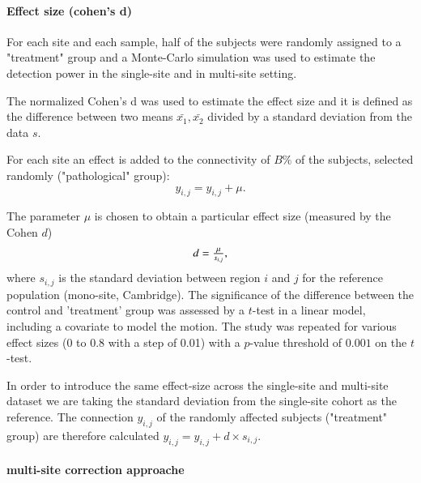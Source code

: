 \documentclass[authoryear]{elsarticle}
\begin{document}
\paragraph{Effect size (cohen's d)}
For each site and each sample, half of the subjects were randomly assigned to a "treatment" group and a Monte-Carlo simulation was used to estimate the detection power in the single-site and in multi-site setting.

The normalized Cohen's d was used to estimate the effect size and it is defined as the difference between two means $\bar{x_{1}},\bar{x_{2}}$ divided by a standard deviation from the data $s$.

For each site an effect is added to the connectivity of $B\%$ of the subjects, selected randomly ("pathological" group):
\begin{equation}
	y_{i,j} = y_{i,j} + \mu.
\end{equation}

The parameter $\mu$ is chosen to obtain a particular effect size (measured by the Cohen $d$)
\begin{equation}\label{cohen's d}
    \begin{array}{l l}
      d = \frac{\mu}{s_{i,j}},      
    \end{array}
\end{equation}
where $s_{i,j}$ is the standard deviation between region $i$ and $j$ for the reference population (mono-site, Cambridge). The significance of the difference between the control and 'treatment' group was assessed by a $t$-test in a linear model, including a covariate to model the motion. The study was repeated for various effect sizes (0 to 0.8 with a step of 0.01) with a $p$-value threshold of $0.001$ on the $t$-test.

In order to introduce the same effect-size across the single-site and multi-site dataset we are taking the standard deviation from the single-site cohort as the reference.  The connection $y_{i,j}$ of the randomly affected subjects ("treatment" group) are therefore calculated $y_{i,j} = y_{i,j} + d\times s_{i,j}$. 

\paragraph{multi-site correction approache} 
\end{document}
